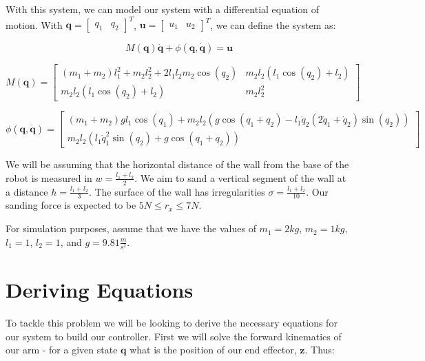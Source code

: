 \documentclass{article}
\begin{document}
With this system, we can model our system with a differential equation of motion. With $\boldsymbol{q} = \begin{bmatrix} q_1 & q_2 \end{bmatrix}^T$, $\boldsymbol{u} = \begin{bmatrix} u_1 & u_2 \end{bmatrix}^T$, we can define the system as:

\begin{equation}
    M(\boldsymbol{q})\boldsymbol{\ddot{q}} + \phi(\boldsymbol{q}, \boldsymbol{\dot{q}}) = \boldsymbol{u}
\end{equation}

\begin{equation}
    M(\boldsymbol{q}) = \begin{bmatrix}
        (m_1+m_2)l_1^2+m_2 l_2^2 + 2 l_1 l_2 m_2 \cos(q_2) & m_2l_2(l_1 \cos(q_2) + l_2) \\
        m_2 l_2 (l_1 \cos(q_2)+l_2) & m_2 l_2^2
    \end{bmatrix}
\end{equation}

\begin{equation}
    \phi(\boldsymbol{q}, \boldsymbol{\dot{q}}) = \begin{bmatrix}
        (m_1+m_2)gl_1 \cos(q_1) + m_2 l_2 (g \cos(q_1+q_2) - l_1 \dot{q}_2(2\dot{q}_1+\dot{q}_2)\sin(q_2)) \\
        m_2 l_2  (l_1 \dot{q}_1^2 \sin(q_2) + g \cos(q_1 + q_2))
    \end{bmatrix}
\end{equation}

We will be assuming that the horizontal distance of the wall from the base of the robot is measured in $w = \frac{l_1 + l_2}{2}$. We aim to sand a vertical segment of the wall at a distance $h = \frac{l_1+l_2}{3}$. The surface of the wall has irregularities $\sigma = \frac{l_1+l_2}{10}$. Our sanding force is expected to be $5 N \leq r_x \leq 7 N$.

For simulation purposes, assume that we have the values of $m_1 = 2kg$, $m_2 = 1kg$, $l_1 = 1$, $l_2=1$, and $g = 9.81\frac{m}{s^2}$.

\section*{Deriving Equations}

To tackle this problem we will be looking to derive the necessary equations for our system to build our controller. First we will solve the forward kinematics of our arm - for a given state $\boldsymbol{q}$ what is the position of our end effector, $\boldsymbol{z}$. Thus:
\end{document}
